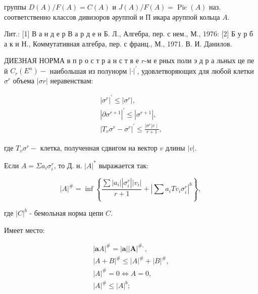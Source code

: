\documentclass[10pt]{article}
\begin{document}
группы $D(A) / F(A)=C(A)$ и $J(A) / F(A)=\operatorname{Pic}(A)$ наз. соответственно классов дивизоров әруппой и П икара әруппой кольца $A$.



Лит.: [1] В а н д е р В а р д е н Б. Л., Алгебра, пер. с нем., М., 1976: [2] Б у р б а к и Н., Коммутативная алгебра, пер. с франц., М., 1971. В. И. Данилов.



ДИЕЗНАЯ НОРМА в п р о с т р а н с т в е $r$-м е рных поли э д р а льных це пе й $C_{r}\left(E^{n}\right)-$ наибольшая из полунорм $|\cdot|^{\prime}$, удовлетворяющих для любой клетки $\sigma^{r}$ объема $|\sigma r|$ неравенствам:



\[

\begin{gathered}

\left|\sigma^{r}\right|^{\prime} \leqslant\left|\sigma^{r}\right|, \\

\left|\partial \sigma^{r+1}\right|^{\prime} \leqslant\left|\sigma^{r+1}\right|, \\

\left|T_{v} \sigma^{r}-\sigma^{r}\right|^{\prime} \leqslant \frac{\left|\sigma^{r}\right| v \mid}{r+1},

\end{gathered}

\]



где $T_{v} \sigma^{r}-$ клетка, полученная сдвигом на вектор $v$ длины $|v|$.



Если $A=\Sigma a_{i} \sigma_{i}^{r}$, то Д. н. $|A|^{*}$ выражается так:



\[

|A|^{\#}=\inf \left\{\frac{\sum\left|a_{i}\right|\left|\sigma_{i}^{r}\right|\left|v_{i}\right|}{r+1}+\left|\sum a_{i} T v_{i} \sigma_{i}^{r}\right|^{b}\right\} \text {, }

\]



где $|C|^{b}$ - бемольная норма цепи $C$.



Имеет место:



\[

\begin{gathered}

|\boldsymbol{a} A|^{\#}=|\boldsymbol{a}||\boldsymbol{A}|^{\#,}, \\

|A+B|^{\#} \leqslant|A|^{\#}+|B|^{\#}, \\

|A|^{\#}=0 \Leftrightarrow A=0, \\

|A|^{\#} \leqslant|A|^{b} ;

\end{gathered}

\]
\end{document}

